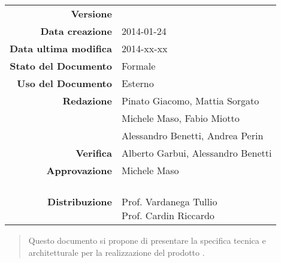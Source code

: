 


\newcommand{\Versione}{\versioneSpecificaTecnica{}}	  %
\newcommand{\Data}{2014-01-24}				           %
\newcommand{\DataUltimaModifica}{2014-xx-xx}
\newcommand{\TipoDocumento}{Specifica Tecnica}	       %



\begin{center}
\begin{tabular}{r|l}
\textbf{Versione} & \Versione{} \\
\textbf{Data creazione} & \Data{} \\
\textbf{Data ultima modifica} & \DataUltimaModifica{} \\
\textbf{Stato del Documento} & Formale \\		          %
\textbf{Uso del Documento} & Esterno \\			          %
\textbf{Redazione} &  Pinato Giacomo, Mattia Sorgato\\	  %
& Michele Maso, Fabio Miotto\\
& Alessandro Benetti, Andrea Perin\\
\textbf{Verifica} & Alberto Garbui, Alessandro Benetti\\  %
\textbf{Approvazione} & Michele Maso\\				      %
\textbf{Distribuzione} & \parbox[t]{4cm}{\NomeGruppo{}\\Prof. Vardanega Tullio\\Prof. Cardin Riccardo\\ \Prop{} }\\
\end{tabular}
\end{center}

\vspace{0.05in}

\begin{abstract}
\begin{center}
Questo documento si propone di presentare la specifica tecnica e architetturale per la realizzazione del prodotto \Progetto{}.
\end{center}
\end{abstract}

